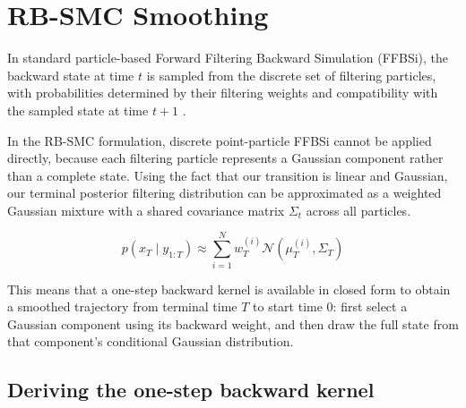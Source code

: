\section{RB-SMC Smoothing}
\label{sec:rb-smc-smoothing}

In standard particle-based Forward Filtering Backward Simulation (FFBSi), the backward state at time $t$ is sampled from the discrete set of filtering particles, with probabilities determined by their filtering weights and compatibility with the sampled state at time $t+1$ \citep{godsilldoucetwest2004montecarlosmoothing}. 


In the RB-SMC formulation, discrete point-particle FFBSi cannot be applied directly, because each filtering particle represents a Gaussian component rather than a complete state. Using the fact that our transition is linear and Gaussian, our terminal posterior filtering distribution can be approximated as a weighted Gaussian mixture with a shared covariance matrix $\Sigma_t$ across all particles.

\begin{equation}
    p(x_{T} \mid y_{1:T}) \approx \sum_{i=1}^N w_{T}^{(i)} \mathcal{N}(\mu_T^{(i)}, \Sigma_T)
\end{equation}

This means that a one-step backward kernel is available in closed form to obtain a smoothed trajectory from terminal time $T$ to start time $0$: first select a Gaussian component using its backward weight, and then draw the full state from that component's conditional Gaussian distribution. 

\subsection{Deriving the one-step backward kernel}

